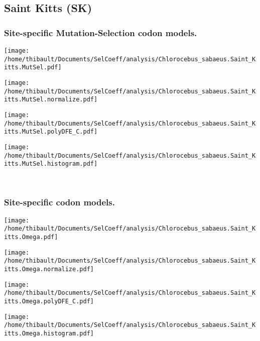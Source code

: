\subsection{Saint Kitts (SK)} 
 
\subsubsection*{Site-specific Mutation-Selection codon models.} 
\begin{minipage}{0.49\linewidth} 
\texttt{[image: /home/thibault/Documents/SelCoeff/analysis/Chlorocebus\_sabaeus.Saint\_Kitts.MutSel.pdf]} 
\end{minipage}
\begin{minipage}{0.49\linewidth} 
\texttt{[image: /home/thibault/Documents/SelCoeff/analysis/Chlorocebus\_sabaeus.Saint\_Kitts.MutSel.normalize.pdf]} 
\end{minipage}
\begin{minipage}{0.49\linewidth} 
\texttt{[image: /home/thibault/Documents/SelCoeff/analysis/Chlorocebus\_sabaeus.Saint\_Kitts.MutSel.polyDFE\_C.pdf]} 
\end{minipage}
\begin{minipage}{0.49\linewidth} 
\texttt{[image: /home/thibault/Documents/SelCoeff/analysis/Chlorocebus\_sabaeus.Saint\_Kitts.MutSel.histogram.pdf]} 
\end{minipage}
\\ 
\subsubsection*{Site-specific codon models.} 
\begin{minipage}{0.49\linewidth} 
\texttt{[image: /home/thibault/Documents/SelCoeff/analysis/Chlorocebus\_sabaeus.Saint\_Kitts.Omega.pdf]} 
\end{minipage}
\begin{minipage}{0.49\linewidth} 
\texttt{[image: /home/thibault/Documents/SelCoeff/analysis/Chlorocebus\_sabaeus.Saint\_Kitts.Omega.normalize.pdf]} 
\end{minipage}
\begin{minipage}{0.49\linewidth} 
\texttt{[image: /home/thibault/Documents/SelCoeff/analysis/Chlorocebus\_sabaeus.Saint\_Kitts.Omega.polyDFE\_C.pdf]} 
\end{minipage}
\begin{minipage}{0.49\linewidth} 
\texttt{[image: /home/thibault/Documents/SelCoeff/analysis/Chlorocebus\_sabaeus.Saint\_Kitts.Omega.histogram.pdf]} 
\end{minipage}
\\ 
